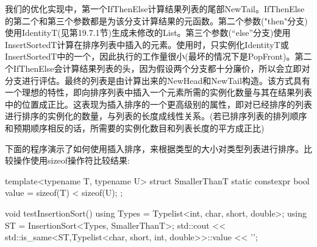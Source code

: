 我们的优化实现中，第一个IfThenElse计算结果列表的尾部NewTail。IfThenElse的第二个和第三个参数都是为该分支计算结果的元函数。第二个参数("then"分支)使用IdentityT(见第19.7.1节)生成未修改的List。第三个参数(“else”分支)使用InsertSortedT计算在排序列表中插入的元素。使用时，只实例化IdentityT或InsertSortedT中的一个，因此执行的工作量很小(最坏的情况下是PopFront)。第二个IfThenElse会计算结果列表的头，因为假设两个分支都十分廉价，所以会立即对分支进行评估。最终的列表是由计算出来的NewHead和NewTail构造。该方式具有一个理想的特性，即向排序列表中插入一个元素所需的实例化数量与其在结果列表中的位置成正比。这表现为插入排序的一个更高级别的属性，即对已经排序的列表进行排序的实例化的数量，与列表的长度成线性关系。(若已排序列表的排列顺序和预期顺序相反的话，所需要的实例化数目和列表长度的平方成正比)

下面的程序演示了如何使用插入排序，来根据类型的大小对类型列表进行排序。比较操作使用sizeof操作符比较结果:

\begin{cpp}
template<typename T, typename U>
struct SmallerThanT {
	static constexpr bool value = sizeof(T) < sizeof(U);
};

void testInsertionSort()
{
	using Types = Typelist<int, char, short, double>;
	using ST = InsertionSort<Types, SmallerThanT>;
	std::cout << std::is_same<ST,Typelist<char, short, int, double>>::value
			<< ’\n’;
}
\end{cpp}

























